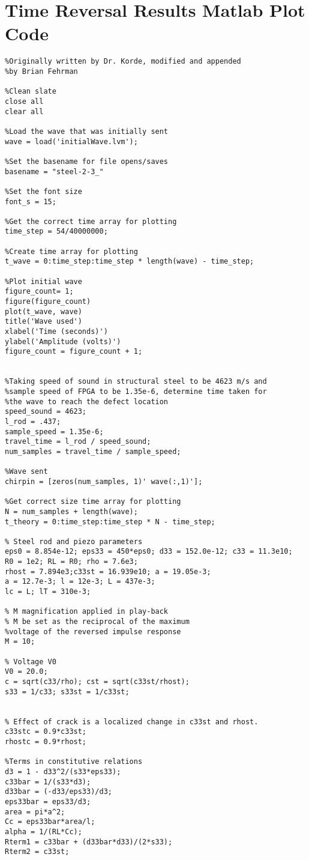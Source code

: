 \section{Time Reversal Results Matlab Plot Code}

\begin{lstlisting}
%Originally written by Dr. Korde, modified and appended
%by Brian Fehrman

%Clean slate
close all
clear all

%Load the wave that was initially sent
wave = load('initialWave.lvm');

%Set the basename for file opens/saves
basename = "steel-2-3_"

%Set the font size
font_s = 15;

%Get the correct time array for plotting
time_step = 54/40000000;

%Create time array for plotting
t_wave = 0:time_step:time_step * length(wave) - time_step;

%Plot initial wave
figure_count= 1;
figure(figure_count)
plot(t_wave, wave)
title('Wave used')
xlabel('Time (seconds)')
ylabel('Amplitude (volts)')
figure_count = figure_count + 1;


%Taking speed of sound in structural steel to be 4623 m/s and
%sample speed of FPGA to be 1.35e-6, determine time taken for
%the wave to reach the defect location
speed_sound = 4623;
l_rod = .437;
sample_speed = 1.35e-6;
travel_time = l_rod / speed_sound;
num_samples = travel_time / sample_speed;

%Wave sent
chirpin = [zeros(num_samples, 1)' wave(:,1)'];

%Get correct size time array for plotting
N = num_samples + length(wave);
t_theory = 0:time_step:time_step * N - time_step;

% Steel rod and piezo parameters
eps0 = 8.854e-12; eps33 = 450*eps0; d33 = 152.0e-12; c33 = 11.3e10;
R0 = 1e2; RL = R0; rho = 7.6e3; 
rhost = 7.894e3;c33st = 16.939e10; a = 19.05e-3;
a = 12.7e-3; l = 12e-3; L = 437e-3;
lc = L; lT = 310e-3;

% M magnification applied in play-back
% M be set as the reciprocal of the maximum 
%voltage of the reversed impulse response
M = 10; 

% Voltage V0
V0 = 20.0;
c = sqrt(c33/rho); cst = sqrt(c33st/rhost);
s33 = 1/c33; s33st = 1/c33st;


% Effect of crack is a localized change in c33st and rhost.
c33stc = 0.9*c33st;
rhostc = 0.9*rhost;

%Terms in constitutive relations
d3 = 1 - d33^2/(s33*eps33);
c33bar = 1/(s33*d3);
d33bar = (-d33/eps33)/d3;
eps33bar = eps33/d3;
area = pi*a^2;
Cc = eps33bar*area/l;
alpha = 1/(RL*Cc);
Rterm1 = c33bar + (d33bar*d33)/(2*s33);
Rterm2 = c33st;


\end{lstlisting}
